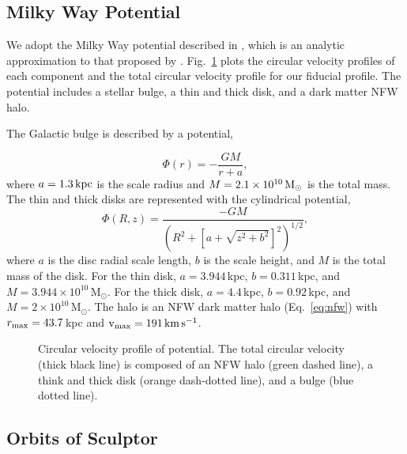 \subsection{Milky Way Potential}\label{milky-way-potential}

We adopt the Milky Way potential described in \citet{EP2020}, which is
an analytic approximation to that proposed by \citet{mcmillan2011}.
Fig.~\ref{fig:v_circ_potential} plots the circular velocity profiles of
each component and the total circular velocity profile for our fiducial
profile. The potential includes a stellar bulge, a thin and thick disk,
and a dark matter NFW halo.

The Galactic bulge is described by a \citet{hernquist1990} potential,

\begin{equation}{
\Phi(r) = - \frac{GM}{r + a},
}\end{equation} where \(a=1.3\,{\rm kpc}\) is the scale radius and
\(M=2.1 \times 10^{10}\,{\rm M}_{\odot}\) is the total mass. The thin and thick
disks are represented with the \citet{miyamoto+nagai1975} cylindrical
potential, \begin{equation}{
\Phi(R, z) = \frac{-GM}{\left(R^2 + \left[a + \sqrt{z^2 + b^2}\right]^{2}\right)^{1/2}},
}\end{equation} where \(a\) is the disc radial scale length, \(b\) is
the scale height, and \(M\) is the total mass of the disk. For the thin
disk, \(a=3.944\,\)kpc, \(b=0.311\,\)kpc, and
\(M=3.944\times10^{10}\,\)M\(_\odot\). For the thick disk,
\(a=4.4\,\)kpc, \(b=0.92\,\)kpc, and \(M=2\times10^{10}\,\)M\(_\odot\).
The halo is an NFW dark matter halo (Eq.~\ref{eq:nfw}) with
\(r_{\rm max} = 43.7\,\)kpc and \({\rm v}_{\rm max} = 191\,{\rm km\,s^{-1}}\).

\begin{figure}
\centering
{}
\caption[Circular velocity of potential]{Circular velocity profile of
\citet{EP2020} potential. The total circular velocity (thick black line)
is composed of an NFW halo (green dashed line), a think and thick
\citet{miyamoto+nagai1975} disk (orange dash-dotted line), and a
\citet{hernquist1990} bulge (blue dotted
line).}\label{fig:v_circ_potential}
\end{figure}

\subsection{Orbits of Sculptor}\label{orbits-of-sculptor}


